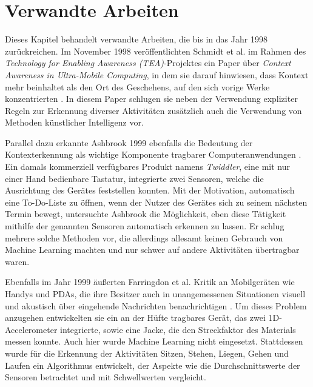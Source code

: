 \chapter{Verwandte Arbeiten}
\label{chap:relatedwork}
Dieses Kapitel behandelt verwandte Arbeiten, die bis in das Jahr 1998 zurückreichen. Im November 1998 veröffentlichten Schmidt et al. im Rahmen des \textit{Technology for Enabling Awareness (TEA)}-Projektes ein Paper über \textit{Context Awareness in Ultra-Mobile Computing}, in dem sie darauf hinwiesen, dass Kontext mehr beinhaltet als den Ort des Geschehens, auf den sich vorige Werke konzentrierten \cite{Schmidt1999}. In diesem Paper schlugen sie neben der Verwendung expliziter Regeln zur Erkennung diverser Aktivitäten zusätzlich auch die Verwendung von Methoden künstlicher Intelligenz vor.

Parallel dazu erkannte Ashbrook 1999 ebenfalls die Bedeutung der Kontexterkennung als wichtige Komponente tragbarer Computeranwendungen \cite{Ashbrook1999}. Ein damals kommerziell verfügbares Produkt namens \textit{Twiddler}, eine mit nur einer Hand bedienbare Tastatur, integrierte zwei Sensoren, welche die Ausrichtung des Gerätes feststellen konnten. Mit der Motivation, automatisch eine To-Do-Liste zu öffnen, wenn der Nutzer des Gerätes sich zu seinem nächsten Termin bewegt, untersuchte Ashbrook die Möglichkeit, eben diese Tätigkeit mithilfe der genannten Sensoren automatisch erkennen zu lassen. Er schlug mehrere solche Methoden vor, die allerdings allesamt keinen Gebrauch von Machine Learning machten und nur schwer auf andere Aktivitäten übertragbar waren.

Ebenfalls im Jahr 1999 äußerten Farringdon et al. Kritik an Mobilgeräten wie Handys und PDAs, die ihre Besitzer auch in unangemessenen Situationen visuell und akustisch über eingehende Nachrichten benachrichtigen \cite{Farringdon1999}. Um dieses Problem anzugehen entwickelten sie ein an der Hüfte tragbares Gerät, das zwei 1D-Accelerometer integrierte, sowie eine Jacke, die den Streckfaktor des Materials messen konnte. Auch hier wurde Machine Learning nicht eingesetzt. Stattdessen wurde für die Erkennung der Aktivitäten Sitzen, Stehen, Liegen, Gehen und Laufen ein Algorithmus entwickelt, der Aspekte wie die Durchschnittswerte der Sensoren betrachtet und mit Schwellwerten vergleicht.

